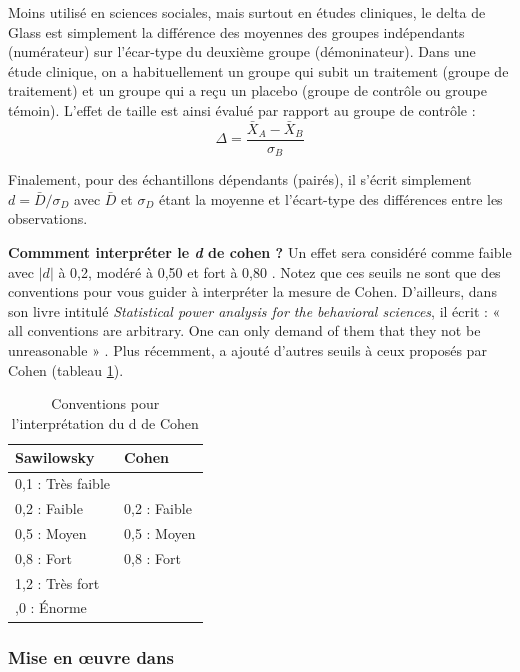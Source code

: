\documentclass[
  11pt,
  french,
]{book}
\begin{document}
Moins utilisé en sciences sociales, mais surtout en études cliniques, le delta de Glass est simplement la différence des moyennes des groupes indépendants (numérateur) sur l'écar-type du deuxième groupe (démoninateur). Dans une étude clinique, on a habituellement un groupe qui subit un traitement (groupe de traitement) et un groupe qui a reçu un placebo (groupe de contrôle ou groupe témoin). L'effet de taille est ainsi évalué par rapport au groupe de contrôle :
\[\Delta = \frac{\bar{X}_{A}-\bar{X}_{B}}{\sigma_B}\]

Finalement, pour des échantillons dépendants (pairés), il s'écrit simplement \(d = \bar{D}/{\sigma_D}\) avec \(\bar{D}\) et \(\sigma_D\) étant la moyenne et l'écart-type des différences entre les observations.

\textbf{Commment interpréter le \emph{d} de cohen ?} Un effet sera considéré comme faible avec \(\lvert d \rvert\) à 0,2, modéré à 0,50 et fort à 0,80 \citep{cohen1992}. Notez que ces seuils ne sont que des conventions pour vous guider à interpréter la mesure de Cohen. D'ailleurs, dans son livre intitulé \emph{Statistical power analysis for the behavioral sciences}, il écrit : « all conventions are arbitrary. One can only demand of them that they not be unreasonable » \citep{cohen2013}. Plus récemment, \citep{sawilowsky2009} a ajouté d'autres seuils à ceux proposés par Cohen (tableau \ref{tab:tableconvcohen}).

\begin{table}

\caption{\label{tab:tableconvcohen}Conventions pour l’interprétation du d de Cohen}
\centering
\fontsize{8}{10}\selectfont
\begin{tabular}[t]{ll}
\toprule
Sawilowsky & Cohen\\
\midrule
0,1 : Très faible & \\
0,2 : Faible & 0,2 : Faible\\
0,5 : Moyen & 0,5 : Moyen\\
0,8 : Fort & 0,8 : Fort\\
1,2 : Très fort & \\
\addlinespace
2,0 : Énorme & \\
\bottomrule
\end{tabular}
\end{table}

\hypertarget{sect04313}{%
\subsubsection{Mise en œuvre dans}\label{sect04313}}
\end{document}
